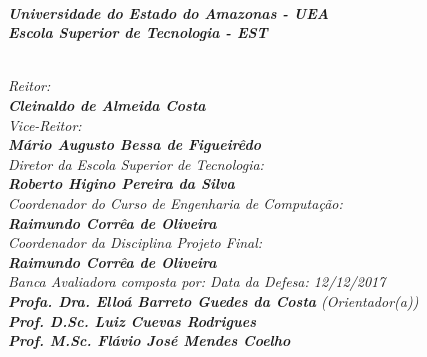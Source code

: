 \begin{spacing}{1.4}
\textit{\textbf{\\
Universidade do Estado do Amazonas - UEA\\
Escola Superior de Tecnologia - EST}}

\textit{\\ Reitor:\\ \textbf{Cleinaldo de Almeida Costa}}\\
\textit{Vice-Reitor:\\ \textbf{Mário Augusto Bessa de Figueirêdo}}
\\
\textit{
Diretor da Escola Superior de Tecnologia:\\
\textbf{Roberto Higino Pereira da Silva}}
\\
\textit{
Coordenador do Curso de Engenharia de Computação:\\
\textbf{Raimundo Corrêa de Oliveira}}
\\
\textit{
Coordenador da Disciplina Projeto Final:\\
\textbf{Raimundo Corrêa de Oliveira}}
\\[12pt]
\textit{
Banca Avaliadora composta por: \hfill Data da Defesa: 12/12/2017\\
}
\textit{
\textbf{Profa. Dra. Elloá Barreto Guedes da Costa} (Orientador(a))\\
\textbf{Prof. D.Sc. Luiz Cuevas Rodrigues}\\%
\textbf{Prof. M.Sc. Flávio José Mendes Coelho}
}
\ \ \\
 \begin{small}
\begin{center}
\end{center}
\end{small}
\end{spacing}
 \newpage
